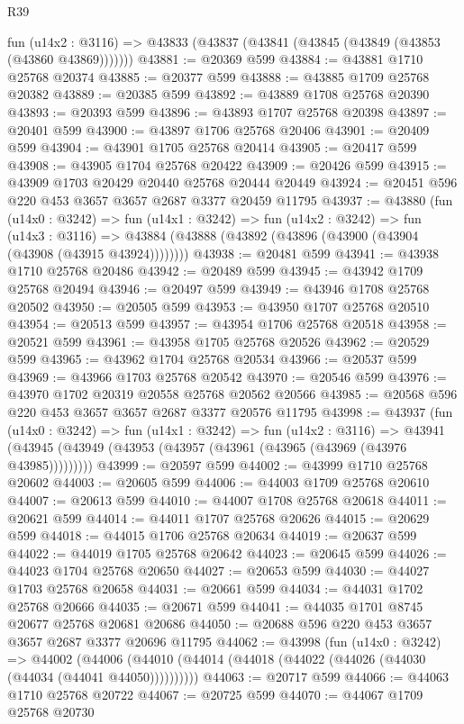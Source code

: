 \begin{lexlean}{R39}
\begin{coremodule}
    fun (u14x2 : @3116) => @43833 (@43837 (@43841 (@43845 (@43849 (@43853 (@43860 @43869)))))))
@43881 := @20369 @599
@43884 := @43881 @1710 @25768 @20374
@43885 := @20377 @599
@43888 := @43885 @1709 @25768 @20382
@43889 := @20385 @599
@43892 := @43889 @1708 @25768 @20390
@43893 := @20393 @599
@43896 := @43893 @1707 @25768 @20398
@43897 := @20401 @599
@43900 := @43897 @1706 @25768 @20406
@43901 := @20409 @599
@43904 := @43901 @1705 @25768 @20414
@43905 := @20417 @599
@43908 := @43905 @1704 @25768 @20422
@43909 := @20426 @599
@43915 := @43909 @1703 @20429 @20440 @25768 @20444 @20449
@43924 := @20451 @596 @220 @453 @3657 @3657 @2687 @3377 @20459 @11795
@43937 := @43880
    (fun (u14x0 : @3242) =>
    fun (u14x1 : @3242) =>
    fun (u14x2 : @3242) =>
    fun (u14x3 : @3116) =>
    @43884 (@43888 (@43892 (@43896 (@43900 (@43904 (@43908 (@43915 @43924))))))))
@43938 := @20481 @599
@43941 := @43938 @1710 @25768 @20486
@43942 := @20489 @599
@43945 := @43942 @1709 @25768 @20494
@43946 := @20497 @599
@43949 := @43946 @1708 @25768 @20502
@43950 := @20505 @599
@43953 := @43950 @1707 @25768 @20510
@43954 := @20513 @599
@43957 := @43954 @1706 @25768 @20518
@43958 := @20521 @599
@43961 := @43958 @1705 @25768 @20526
@43962 := @20529 @599
@43965 := @43962 @1704 @25768 @20534
@43966 := @20537 @599
@43969 := @43966 @1703 @25768 @20542
@43970 := @20546 @599
@43976 := @43970 @1702 @20319 @20558 @25768 @20562 @20566
@43985 := @20568 @596 @220 @453 @3657 @3657 @2687 @3377 @20576 @11795
@43998 := @43937
    (fun (u14x0 : @3242) =>
    fun (u14x1 : @3242) =>
    fun (u14x2 : @3116) =>
    @43941 (@43945 (@43949 (@43953 (@43957 (@43961 (@43965 (@43969 (@43976 @43985)))))))))
@43999 := @20597 @599
@44002 := @43999 @1710 @25768 @20602
@44003 := @20605 @599
@44006 := @44003 @1709 @25768 @20610
@44007 := @20613 @599
@44010 := @44007 @1708 @25768 @20618
@44011 := @20621 @599
@44014 := @44011 @1707 @25768 @20626
@44015 := @20629 @599
@44018 := @44015 @1706 @25768 @20634
@44019 := @20637 @599
@44022 := @44019 @1705 @25768 @20642
@44023 := @20645 @599
@44026 := @44023 @1704 @25768 @20650
@44027 := @20653 @599
@44030 := @44027 @1703 @25768 @20658
@44031 := @20661 @599
@44034 := @44031 @1702 @25768 @20666
@44035 := @20671 @599
@44041 := @44035 @1701 @8745 @20677 @25768 @20681 @20686
@44050 := @20688 @596 @220 @453 @3657 @3657 @2687 @3377 @20696 @11795
@44062 := @43998
    (fun (u14x0 : @3242) =>
    @44002 (@44006 (@44010 (@44014 (@44018 (@44022 (@44026 (@44030 (@44034 (@44041 @44050))))))))))
@44063 := @20717 @599
@44066 := @44063 @1710 @25768 @20722
@44067 := @20725 @599
@44070 := @44067 @1709 @25768 @20730

\end{coremodule}
\end{lexlean}
